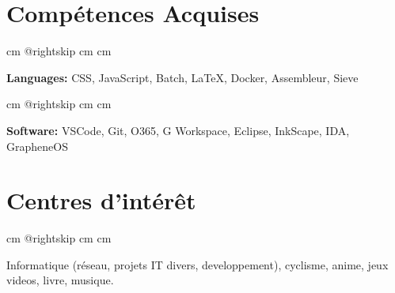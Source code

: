 \documentclass[10pt, fr-FR]{article}
\begin{document}
\section{Compétences Acquises}

\begingroup{} cm
\advance\csname @rightskip cm
\advance{} cm

\textbf{Languages:} CSS, JavaScript, Batch, \LaTeX, Docker, Assembleur, Sieve \par\endgroup

\vspace{0.2 cm}
\begingroup{} cm
\advance\csname @rightskip cm
\advance{} cm

\textbf{Software:} VSCode, Git, O365, G Workspace, Eclipse, InkScape, IDA, GrapheneOS \par\endgroup

\section{Centres d'intérêt}

\begingroup{} cm
\advance\csname @rightskip cm
\advance{} cm

Informatique (réseau, projets IT divers, developpement), cyclisme, anime, jeux videos, livre, musique. \par\endgroup
\end{document}
